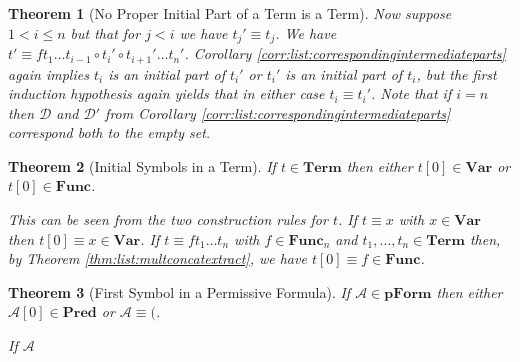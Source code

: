 \documentclass[12pt]{article}
\theoremstyle{break}
\theoremstyle{break}
\newtheorem{theorem}{Theorem}[section]
\theoremstyle{break}
\theoremstyle{break}
\theoremstyle{break}
\newtheorem{informal definition}[definition]{Informal Definition}
\newcommand{\mc}[1]{\mathcal{#1}}
\begin{document}
\begin{theorem}[No Proper Initial Part of a Term is a Term]
Now suppose $1<i \le n$ but that for $j<i$ we have $t_j' \equiv t_j$.
We have $t'\equiv f t_1\ldots t_{i-1} \circ t_i' \circ t_{i+1}'\ldots t_n'$.
Corollary \ref{corr:list:correspondingintermediateparts} again implies $t_i$ is an initial part of $t_i'$ or $t_i'$ is an initial part of $t_i$, but the first induction hypothesis again yields that in either case $t_i\equiv t_i'$. Note that if $i = n$ then $\mc{D}$ and $\mc{D}'$ from Corollary \ref{corr:list:correspondingintermediateparts} correspond both to the empty set.
\end{theorem}

\begin{theorem}[Initial Symbols in a Term]
\label{thm:read:initsymbterm}
If $t\in \textbf{Term}$ then either $t[0]\in\textbf{Var}$ or $t[0]\in\textbf{Func}$.

This can be seen from the two construction rules for $t$.
If $t\equiv x$ with $x\in\textbf{Var}$ then $t[0]\equiv x \in\textbf{Var}$.
If $t\equiv f t_1\ldots t_n$ with $f\in\textbf{Func}_n$ and $t_1,\ldots, t_n\in\textbf{Term}$ then, by Theorem \ref{thm:list:multconcatextract}, we have $t[0] \equiv f \in \textbf{Func}$.
\end{theorem}

\begin{theorem}[First Symbol in a Permissive Formula]
\label{thm:read:pformfirstsymb}
If $\mc{A}\in\textbf{pForm}$ then either $\mc{A}[0]\in\textbf{Pred}$ or $\mc{A}\equiv ($.

If $\mc{A}$

\end{theorem}
\end{document}
